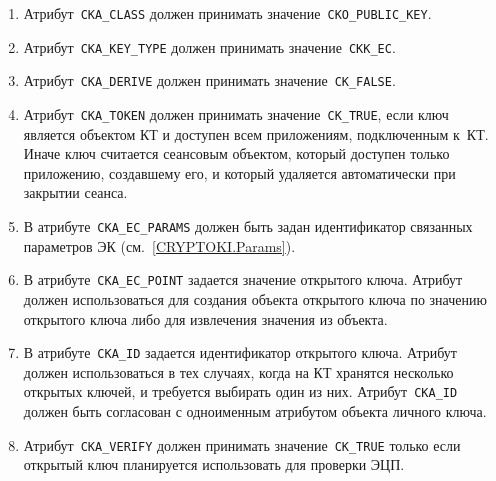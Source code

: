 \begin{enumerate}
\item
Атрибут~\verb|CKA_CLASS| должен принимать значение~\verb|CKO_PUBLIC_KEY|.

\item
Атрибут~\verb|CKA_KEY_TYPE| должен принимать значение~\verb|CKK_EC|.

\item
Атрибут~\verb|CKA_DERIVE| должен принимать значение~\verb|CK_FALSE|.

\item
Атрибут~\verb|CKA_TOKEN| должен принимать значение~\verb|CK_TRUE|,
если ключ является объектом КТ и доступен всем приложениям, подключенным 
к~КТ.  
%
Иначе ключ считается сеансовым объектом, который доступен только
приложению, создавшему его, и который удаляется автоматически при закрытии сеанса.
%

\item
В атрибуте~\verb|CKA_EC_PARAMS| должен быть задан идентификатор связанных 
параметров ЭК (см.~\ref{CRYPTOKI.Params}).

\item
В атрибуте~\verb|CKA_EC_POINT| задается значение открытого ключа. 
Атрибут должен использоваться для создания объекта открытого ключа 
по значению открытого ключа либо для извлечения значения из объекта. 

\item
В атрибуте~\verb|CKA_ID| задается идентификатор открытого ключа. 
Атрибут должен использоваться в тех случаях, когда на КТ  
хранятся несколько открытых ключей, и требуется выбирать один из них. 
%
Атрибут~\verb|CKA_ID| должен быть согласован с одноименным атрибутом 
объекта личного ключа.

\item
Атрибут~\verb|CKA_VERIFY| должен принимать значение~\verb|CK_TRUE| 
только если открытый ключ планируется использовать для проверки ЭЦП.


\end{enumerate}
